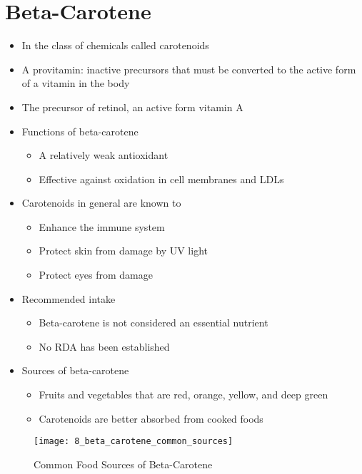 \documentclass[title={Chapter 8}]{fdsn201notes}
\begin{document}
\section{Beta-Carotene}\label{sec:beta-carotene}
\begin{itemize}
	\item In the class of chemicals called carotenoids
	\item A provitamin: inactive precursors that must be converted to the active form of a vitamin in the body
	\item The precursor of retinol, an active form vitamin A
	\item Functions of beta-carotene
	\begin{itemize}
		\item A relatively weak antioxidant
		\item Effective against oxidation in cell membranes and LDLs
	\end{itemize}
	\item Carotenoids in general are known to
	\begin{itemize}
		\item Enhance the immune system
		\item Protect skin from damage by UV light
		\item Protect eyes from damage
	\end{itemize}
	\item Recommended intake
	\begin{itemize}
		\item Beta-carotene is not considered an essential nutrient
		\item No RDA has been established
	\end{itemize}
	\item Sources of beta-carotene
	\begin{itemize}
		\item Fruits and vegetables that are red, orange, yellow, and deep green
		\item Carotenoids are better absorbed from cooked foods
	\end{itemize}
\end{itemize}

\begin{figure}[H]
	\centering
	\texttt{[image: 8\_beta\_carotene\_common\_sources]}
	\caption{Common Food Sources of Beta-Carotene}
	\label{fig:common-food-sources-of-beta}
\end{figure}
\end{document}
